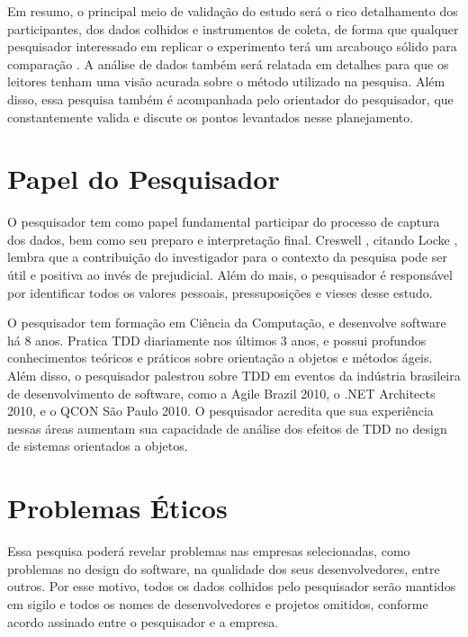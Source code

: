 Em resumo, o principal meio de validação do estudo será o rico detalhamento dos
participantes, dos dados colhidos e instrumentos de coleta, de forma
que qualquer pesquisador interessado em replicar o experimento terá um
arcabouço sólido para comparação \cite{merriam-1998}. A análise de
dados também será relatada em detalhes para que os leitores tenham uma visão
acurada sobre o método utilizado na pesquisa. 
Além disso, essa pesquisa também é acompanhada pelo orientador do pesquisador,
que constantemente valida e discute os pontos levantados nesse planejamento.

\section{Papel do Pesquisador}
\label{sec:planejamento-papel}

O pesquisador tem como papel fundamental participar do processo de captura dos
dados, bem como seu preparo e interpretação final.
Creswell \cite{creswell}, citando Locke \cite{locke}, lembra
que a contribuição do investigador para o contexto da pesquisa pode ser útil e
positiva ao invés de prejudicial. Além do mais, o pesquisador é responsável por
identificar todos os valores pessoais, pressuposições e vieses desse estudo.

O pesquisador tem formação em Ciência da Computação, e desenvolve software há 8
anos. Pratica TDD diariamente nos últimos 3 anos, e possui profundos
conhecimentos teóricos e práticos sobre orientação a objetos e métodos ágeis.
Além disso, o pesquisador palestrou sobre TDD em eventos da indústria brasileira
de desenvolvimento de software, como a Agile Brazil 2010, o .NET Architects
2010, e o QCON São Paulo 2010. O pesquisador acredita que sua experiência nessas
áreas aumentam sua capacidade de análise dos efeitos de TDD no design de sistemas 
orientados a objetos.

\section{Problemas Éticos}
\label{sec:planejamento-etica}

Essa pesquisa poderá revelar problemas nas empresas selecionadas, como problemas
no design do software, na qualidade dos seus desenvolvedores, entre outros. 
Por esse motivo, todos os dados colhidos pelo pesquisador serão mantidos em
sigilo e todos os nomes de desenvolvedores e projetos omitidos, conforme acordo 
assinado entre o pesquisador e a empresa.

